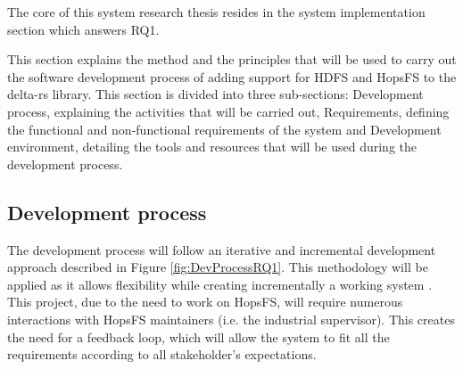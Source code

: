 The core of this system research thesis resides in the system implementation section which answers RQ1.

This section explains the method and the principles that will be used to carry out the software development process of adding support for \gls{HDFS} and \gls{HopsFS} to the delta-rs library. This section is divided into three sub-sections: Development process, explaining the activities that will be carried out, Requirements, defining the functional and non-functional requirements of the system and Development environment, detailing the tools and resources that will be used during the development process.

\subsection{Development process}
\label{subsec:dev_process}
The development process will follow an iterative and incremental development approach described in Figure \ref{fig:DevProcessRQ1}. This methodology will be applied as it allows flexibility while creating incrementally a working system \cite{despa2014comparative}. This project, due to the need to work on \gls{HopsFS}, will require numerous interactions with \gls{HopsFS} maintainers (i.e. the industrial supervisor). This creates the need for a feedback loop, which will allow the system to fit all the requirements according to all stakeholder's expectations.

